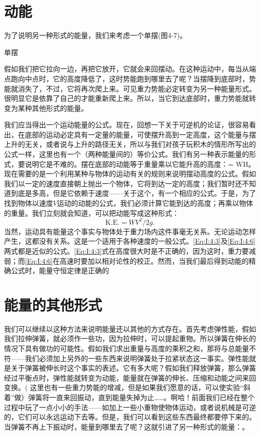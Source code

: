 \documentclass[12pt,oneside]{book}
\begin{document}
\section{动能}
为了说明另一种形式的能量，我们来考虑一个单摆(图4-7)。
\begin{fig}{单摆}
\caption{单摆}
\label{fig:单摆}
\end{fig}
假如我们把它拉向一边，再把它放开，它就会来回摆动。在这种运动中，每当从端点跑向中点时，它的高度降低了，这时势能跑到哪里去了呢？当摆降到底部时，势能就消失了，不过，它将再次爬上来。可见重力势能必定转变为另一种能量形式。很明显它是依靠了自己的才能重新爬上来。所以，当它到达底部时，重力势能就转变为某种其他形式的能量。

我们应当得出一个运动能量的公式。现在，回想一下关于可逆机的论证，很容易看出，在底部的运动必定具有一定量的能量，可使摆升高到一定高度，这个能量与摆上升的无关，或者说与上升的路径无关，所以与我们对孩子玩积木的情形所写出的公式一样，这里也有一个（两种能量间的）等价公式。我们有另一种表示能量的形式，要说明它是不难的。摆在底部的动能等于重量乘以它能升高的高度：= WH。现在需要的是一个利用某种与物体的运动有关的规则来说明摆动高度的公式。假如我们以一定的速度直接朝上抛出一个物体，它将到达一定的高度；我们暂时还不知道到底是多高，但是它依赖于速度——关于这个，有一个相应的公式。于是，为了找到物体以速度$ V $运动的动能的公式，我们必须计算它能到达的高度；再乘以物体的重量。我们立刻就会知道，可以把动能写成这种形式：
\begin{equation}
\label{Eq:I:4:6}
\text{K.E.}=WV^2/2g.
\end{equation}
当然，运动具有能量这个事实与物体处于重力场内这件事毫无关系。无论运动怎样产生，这都没有关系。这是一个适用于各种速度的一般公式。\eqref{Eq:I:4:3}及\eqref{Eq:I:4:6}两式都是近似的公式。\eqref{Eq:I:4:3}式在高度很大时是不正确的，因为这时，重力要减弱；而\eqref{Eq:I:4:6}在高速时要加以相对论性的校正。然而，当我们最后得到动能的精确公式时，能量守恒定律是正确的


\section{能量的其他形式}
我们可以继续以这种方法来说明能量还以其他的方式存在。首先考虑弹性能，假如我们拉伸弹簧，就必须作一些功，因为拉伸时，可以提起重物。所以弹簧在伸长的情况下具有做功的可能性。假如我们求出重量与高度的乘积之和，那将与总能量不符——我们必须加上另外的一些东西来说明弹簧处于拉紧状态这一事实。弹性能就是关于弹簧被伸长时这个事实的表述。它有多大呢？假如我们释放弹簧，那么弹簧经过平衡点时，弹性能就转变为动能，能量就在弹簧的伸长、压缩和动能之间来回变换。( 这里也有一些重力势能的增减，但是如果我们愿意的话，可以使实验“斜着”做）弹簧将一直来回振动，直到能量失掉为止……。啊哈！前面我们已经在整个过程中玩了一点小小的手法——如加上一些小重物使物体运动，或者说机械是可逆的，它们可以永远运动下去等。但是，我们可以看到这些东西最终都要停下来的。当弹簧不再上下振动时，能量到哪里去了呢？这就引进了另一种形式的能量：。
\end{document}

